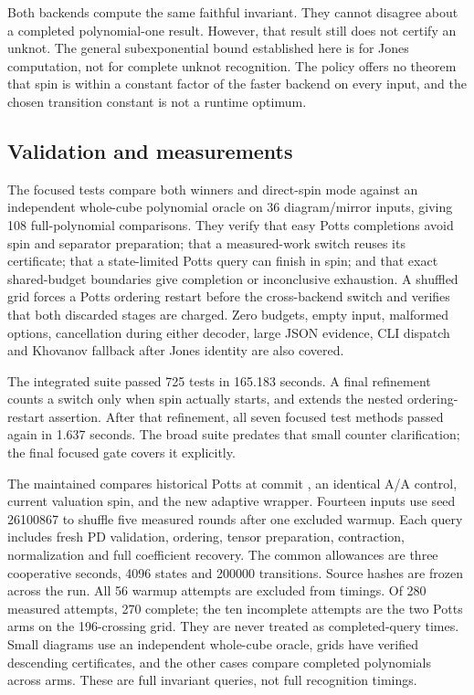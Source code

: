 Both backends compute the same faithful invariant. They cannot disagree
about a completed polynomial-one result. However, that result still does not
certify an unknot. The general subexponential bound established here is for
Jones computation, not for complete unknot recognition. The policy offers
no theorem that spin is within a constant factor of the faster backend on
every input, and the chosen transition constant is not a runtime optimum.

\subsection{Validation and measurements}
The focused tests compare both winners and direct-spin mode against an
independent whole-cube polynomial oracle on 36 diagram/mirror inputs, giving
108 full-polynomial comparisons. They verify that easy Potts completions
avoid spin and separator preparation; that a measured-work switch reuses its
certificate; that a state-limited Potts query can finish in spin; and that
exact shared-budget boundaries give completion or inconclusive exhaustion.
A shuffled grid forces a Potts ordering restart before the cross-backend
switch and verifies that both discarded stages are charged. Zero budgets,
empty input, malformed options, cancellation during either decoder, large
JSON evidence, CLI dispatch and Khovanov fallback after Jones identity are
also covered.

The integrated suite passed 725 tests in 165.183 seconds. A final refinement
counts a switch only when spin actually starts, and extends the nested
ordering-restart assertion. After that refinement, all seven focused test
methods passed again in 1.637 seconds. The broad suite predates that small
counter clarification; the final focused gate covers it explicitly.

The maintained  compares historical Potts
at commit , an identical A/A control, current valuation spin,
and the new adaptive wrapper. Fourteen inputs use seed 26100867 to shuffle
five measured rounds after one excluded warmup. Each query includes fresh
PD validation, ordering, tensor preparation, contraction, normalization and
full coefficient recovery. The common allowances are three cooperative
seconds, 4096 states and 200000 transitions. Source hashes are frozen across
the run. All 56 warmup attempts are excluded from timings. Of 280 measured
attempts, 270 complete; the ten incomplete attempts are the two Potts arms
on the 196-crossing grid. They are never treated as completed-query times.
Small diagrams use an independent whole-cube oracle, grids have verified
descending certificates, and the other cases compare completed polynomials
across arms. These are full invariant queries, not full recognition timings.

